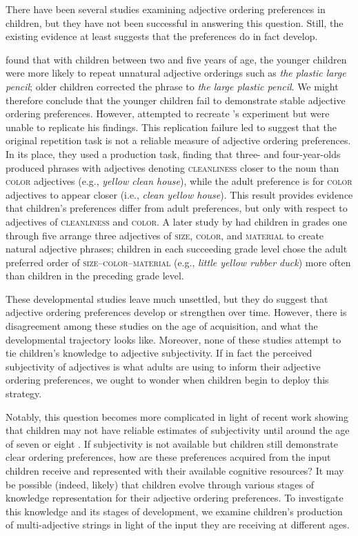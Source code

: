 \documentclass[10pt]{article}
\begin{document}
There have been several studies examining adjective ordering preferences in children, but they have not been successful in answering this question. Still, the existing evidence at least suggests that the preferences do in fact develop.

\cite{bever1970cognitive} found that with children between two and five years of age, the younger children were more likely to repeat unnatural adjective orderings such as \textit{the plastic large pencil}; older children corrected the phrase to \textit{the large plastic pencil}. We might therefore conclude that the younger children fail to demonstrate stable adjective ordering preferences. However, \cite{martin1972preferred} attempted to recreate \citeauthor{bever1970cognitive}'s experiment but were unable to replicate his findings. This replication failure led \citeauthor{martin1972preferred} to suggest that the original repetition task is not a reliable measure of adjective ordering preferences. In its place, they   used a production task, finding that three- and four-year-olds produced phrases with adjectives denoting \textsc{cleanliness} closer to the noun than \textsc{color} adjectives (e.g., \textit{yellow clean house}), while the adult preference is for \textsc{color} adjectives to appear closer (i.e., \textit{clean yellow house}). This result provides  evidence that children's preferences differ from adult preferences, but only with respect to adjectives of \textsc{cleanliness} and \textsc{color}. A later study by \cite{hare1978development} had children in grades one through five arrange three adjectives of \textsc{size}, \textsc{color}, and \textsc{material} to create natural adjective phrases; children in each succeeding grade level chose the adult preferred order of \textsc{size}--\textsc{color}--\textsc{material} (e.g., \textit{little yellow rubber duck})
more often than children in the preceding grade level. 

These developmental studies leave much unsettled, but they do suggest that adjective ordering preferences develop or strengthen over time. However, there is disagreement among these studies on the age of acquisition, and what the developmental trajectory looks like. Moreover, none of these studies attempt to tie children's knowledge to adjective subjectivity. If in fact the perceived subjectivity of adjectives is what adults are using to inform their adjective ordering preferences, we ought to wonder when children begin to deploy this strategy. 

Notably, this question becomes more complicated in light of recent work showing that children may not have reliable estimates of subjectivity until around the age of seven or eight \citep{fousheesrinivasan2017}. If subjectivity is not available but children still demonstrate clear ordering preferences, how are these preferences acquired from the input children receive and represented with their available cognitive resources? It may be possible (indeed, likely) that children evolve through various stages of knowledge representation for their adjective ordering preferences. To investigate this knowledge and its stages of development, we examine children's production of multi-adjective strings in light of the input they are receiving at different ages.
\end{document}
